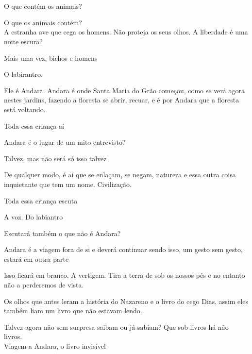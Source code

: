 \chapter*{}


\forceindent{}O que contém os animais?

O que os animais contém?\\

A estranha ave que cega os homens. Não proteja os seus olhos. A liberdade é uma noite escura?

Mais uma vez, bichos e homens

\pagebreak

\vspace*{4cm}

O labirantro.

Ele é Andara. Andara é onde Santa Maria do Grão começou, como se verá
agora nestes jardins, fazendo a floresta se abrir, recuar, e é por
Andara que a floresta está voltando.

Toda essa criança aí

Andara é o lugar de um mito entrevisto?

Talvez, mas não será só isso talvez

De qualquer modo, é aí que se enlaçam, se negam, natureza e essa outra
coisa inquietante que tem um nome. Civilização.

Toda essa criança escuta

A voz. Do labiantro

\pagebreak

\vspace*{4cm}

Escutará também o que não é Andara?

Andara é a viagem fora de si e deverá continuar sendo isso, um gesto sem
gesto, estará em outra parte

Isso ficará em branco. A vertigem. Tira a terra de sob os nossos pés e
no entanto não a perderemos de vista.

Os olhos que antes leram a história do Nazareno e o livro do cego Dias,
assim eles também liam um livro que não estavam lendo.

Talvez agora não sem surpresa saibam ou já sabiam? Que sob livros há não
livros.\\

Viagem a Andara, o livro invisível

